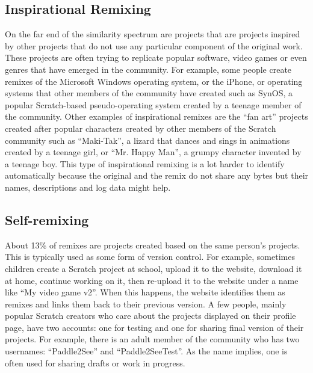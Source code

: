 \subsection{Inspirational Remixing}
On the far end of the similarity spectrum are projects that are projects inspired by other projects that do not use any particular component of the original work.
These projects are often trying to replicate popular software, video games or even genres that have emerged in the community.
For example, some people create remixes of the Microsoft Windows operating system, or the iPhone, or operating systems that other members of the community have created such as SynOS, a popular Scratch-based pseudo-operating system created by a teenage member of the community.
Other examples of inspirational remixes are the ``fan art'' projects created after popular characters created by other members of the Scratch community such as ``Maki-Tak'', a lizard that dances and sings in animations created by a teenage girl,  or  ``Mr. Happy Man'', a grumpy character invented by a teenage boy.
This type of inspirational remixing is a lot harder to identify automatically because the original and the remix do not share any bytes but their names, descriptions and log data might help. 

\subsection{Self-remixing}
About 13\% of remixes are projects created based on the same person's projects.
This is typically used as some form of version control.
For example, sometimes children create a Scratch project at school, upload it to the website, download it at home, continue working on it, then re-upload it to the website under a name like ``My video game v2''.
When this happens, the website identifies them as remixes and links them back to their previous version.
A few people, mainly popular Scratch creators who care about the projects displayed on their profile page, have two accounts: one for testing and one for sharing final version of their projects.
For example, there is an adult member of the community who has two usernames: ``Paddle2See'' and ``Paddle2SeeTest''.
As the name implies, one is often used for sharing drafts or work in progress.
 
